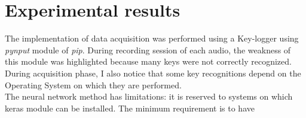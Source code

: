 \chapter{Experimental results}
The implementation of data acquisition was performed using a Key-logger using \textit{pynput} module of \textit{pip}. During recording session of each audio, the weakness of this module was highlighted because many keys were not correctly recognized. During acquisition phase, I also notice that some key recognitions depend on the Operating System on which they are performed.\\
The neural network method has limitations: it is reserved to systems on which keras module can be installed. The minimum requirement is to have 
